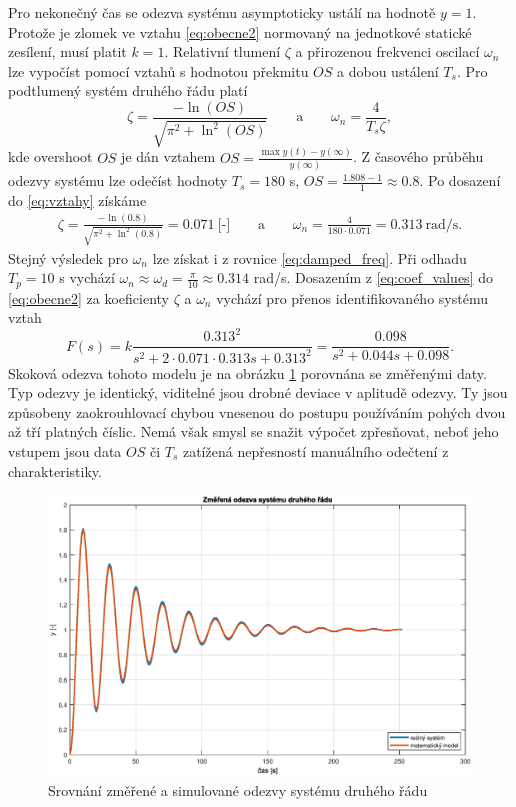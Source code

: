 \documentclass[twoside]{article}
\begin{document}
Pro nekonečný čas se odezva systému asymptoticky ustálí na hodnotě $y = 1$. Protože je zlomek ve vztahu \eqref{eq:obecne2} normovaný na jednotkové statické zesílení,
musí platit $k = 1$. Relativní tlumení $\zeta$ a přirozenou frekvenci oscilací $\omega_n$ lze vypočíst pomocí vztahů s hodnotou překmitu $OS$ a dobou ustálení $T_s$.
Pro podtlumený systém druhého řádu platí
\begin{equation}
	\zeta = \frac{- \ln(OS)}{\sqrt{\pi^2 + \ln^2(OS)}} ~~~~~~~~~ \text{a} ~~~~~~~~~ \omega_n = \frac{4}{T_s \zeta},
	\label{eq:vztahy}
\end{equation}
kde overshoot $OS$ je dán vztahem $OS = \frac{\max y(t) - y(\infty)}{y(\infty)}$.
Z časového průběhu odezvy systému lze odečíst hodnoty $T_s = 180$ s, $OS = \frac{1.808 - 1}{1} \approx 0.8$.
Po dosazení do \eqref{eq:vztahy} získáme
\begin{equation}
	\begin{split}
		\zeta = \frac{- \ln(0.8)}{\sqrt{\pi^2 + \ln^2(0.8)}} = 0.071~\text{[-]} ~~~~~~~~~ \text{a} ~~~~~~~~~ \omega_n = \frac{4}{180 \cdot 0.071} = 0.313~\text{rad/s}.
	\end{split}
	\label{eq:coef_values}
\end{equation}
Stejný výsledek pro $\omega_n$ lze získat i z rovnice \eqref{eq:damped_freq}. Při odhadu $T_p = 10$ s vychází $\omega_n \approx \omega_d = \frac{\pi}{10} \approx 0.314$ rad/s.
Dosazením z \eqref{eq:coef_values} do \eqref{eq:obecne2} za koeficienty $\zeta$ a $\omega_n$ vychází pro přenos identifikovaného systému vztah
\begin{equation}
	F(s) = k \frac{0.313^2}{s^2 + 2 \cdot 0.071 \cdot 0.313 s + 0.313^2} = \frac{0.098}{s^2 + 0.044s + 0.098}.
\end{equation}
Skoková odezva tohoto modelu je na obrázku \ref{fig:zaver2} porovnána se změřenými daty. Typ odezvy je identický,
viditelné jsou drobné deviace v aplitudě odezvy. Ty jsou způsobeny zaokrouhlovací chybou vnesenou
do postupu používáním pohých dvou až tří platných číslic. Nemá však smysl se snažit výpočet zpřesňovat, neboť jeho vstupem
jsou data $OS$ či $T_s$ zatížená nepřesností manuálního odečtení z charakteristiky.
\begin{figure}[hbtp]
	\centering
	\includegraphics[width=\linewidth]{odezvy2.eps}
	\caption{Srovnání změřené a simulované odezvy systému druhého řádu}
	\label{fig:zaver2}
\end{figure}
\end{document}
